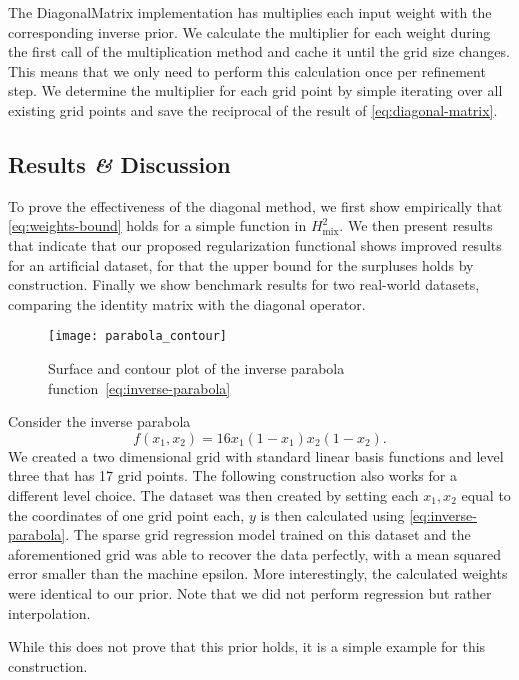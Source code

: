 The DiagonalMatrix implementation has multiplies each input weight with the
corresponding inverse prior.
We calculate the multiplier for each weight during the first call of the
multiplication method and cache it until the grid size changes.
This means that we only need to perform this calculation once per refinement
step.
We determine the multiplier for each grid point by simple iterating over all
existing grid points and save the reciprocal of the result of \cref{eq:diagonal-matrix}.

\subsection{Results \textit{\&} Discussion}\label{sec:tikh-discussion}
To prove the effectiveness of the diagonal method, we first show empirically that \cref{eq:weights-bound} holds for a simple function in \(H^2_{\text{mix}}\).
We then present results that indicate that our proposed regularization functional shows improved results for an artificial dataset, for that the upper bound for the surpluses holds by construction.
Finally we show benchmark results for two real-world datasets, comparing the identity matrix with the diagonal operator.

\begin{figure}[ht]
  \centering
    \texttt{[image: parabola\_contour]}
  \caption{Surface and contour plot of the inverse parabola function~\ref{eq:inverse-parabola}}
\end{figure}

Consider the inverse parabola
\begin{equation}\label{eq:inverse-parabola}
  f(x_1, x_2) = 16x_1(1-x_1)x_2(1-x_2).
\end{equation}
We created a two dimensional grid with standard linear basis functions and level three that has 17 grid points.
The following construction also works for a different level choice.
The dataset was then created by setting each \(x_1, x_2\) equal to the coordinates of one grid point each, \(y\) is then calculated using \cref{eq:inverse-parabola}.
The sparse grid regression model trained on this dataset and the aforementioned grid was able to recover the data perfectly, with a mean squared error smaller than the machine epsilon. More interestingly, the calculated weights were identical to our prior.
Note that we did not perform regression but rather interpolation.

While this does not prove that this prior holds, it is a simple example for this construction.

